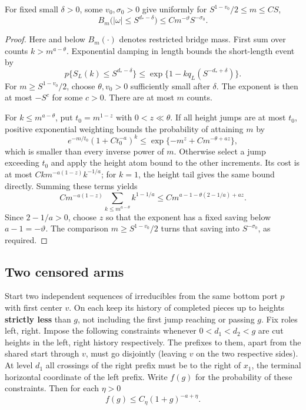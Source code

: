 \begin{lemma}\label{R:cal:short}
For fixed small \(\delta>0\), some \(v_0,\sigma_0>0\) give uniformly for \(S^{1-v_0}/2\le m\le C S\),
\begin{equation}
 B_m\big(|\omega|\le S^{d_*-\delta}\big)\le C m^{-\vartheta} S^{-\sigma_0}.          \label{R:cal:short-height}
\end{equation}
\end{lemma}
\begin{proof}
Here and below $B_m(\cdot)$ denotes restricted bridge mass.
First sum over counts $k>m^{a-\theta}$. Exponential damping in length
bounds the short-length event by
\[
 p\{S_L(k)\le S^{d_*-\delta}\}
 \le \exp\{1-kq_L(S^{-d_*+\delta})\}.
\]
For $m\ge S^{1-v_0}/2$, choose $\theta,v_0>0$ sufficiently small
after $\delta$. The exponent is then at most $-S^c$ for some $c>0$.
There are at most $m$ counts.

For $k\le m^{a-\theta}$, put $t_0=m^{1-z}$ with $0<z\ll\theta$.
If all height jumps are at most $t_0$, positive exponential weighting
bounds the probability of attaining $m$ by
\[
 e^{-m/t_0}(1+C t_0^{-a})^k
 \le \exp\{-m^z+C m^{-\theta+az}\},
\]
which is smaller than every inverse power of $m$. Otherwise select a
jump exceeding $t_0$ and apply the height atom bound to the other
increments. Its cost is at most
$Ck m^{-a(1-z)}k^{-1/a}$; for $k=1$, the height tail gives the same
bound directly. Summing these terms yields
\[
 C m^{-a(1-z)}\sum_{k\le m^{a-\theta}}k^{1-1/a}
 \le C m^{a-1-\theta(2-1/a)+az}.
\]
Since $2-1/a>0$, choose $z$ so that the exponent has a fixed saving
below $a-1=-\vartheta$. The comparison $m\ge S^{1-v_0}/2$ turns
that saving into $S^{-\sigma_0}$, as required.

\end{proof}

\subsection{Two censored arms}\label{R:cal:censored}

\begin{lemma}\label{R:cal:survival}
Start two independent sequences of irreducibles from the same bottom port \(p\) with first center \(v\). On each keep its history of completed pieces up to heights \textbf{strictly less} than \(g\), not including the first jump reaching or passing \(g\). Fix roles left, right. Impose the following constraints whenever \(0<d_1<d_2<g\) are cut heights in the left, right history respectively. The prefixes to them, apart from the shared start through \(v\), must go disjointly (leaving \(v\) on the two respective sides). At level \(d_1\) all crossings of the right prefix must be to the right of \(x_1\), the terminal horizontal coordinate of the left prefix. Write \(f(g)\) for the probability of these constraints. Then for each \(\eta>0\)
\begin{equation}
 f(g)\le C_\eta (1+g)^{-a+\eta}.                                             \label{R:cal:survival-bound}
\end{equation}

\end{lemma}

